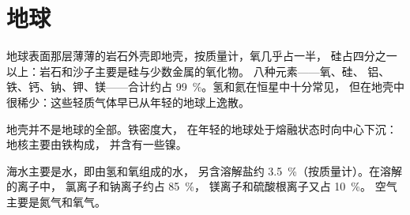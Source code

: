 \section{地球}

\begin{proposition}[地壳]\label{prop:g9:elements-universe-earth:crust}
地球表面那层薄薄的岩石外壳即地壳，按质量计，氧几乎占一半，
硅占四分之一以上：岩石和沙子主要是硅与少数金属的氧化物。
八种元素——氧、硅、
铝、铁、钙、钠、钾、镁——合计约占
\qty{99}{\percent}。氢和氦在恒星中十分常见，
但在地壳中很稀少：这些轻质气体早已从年轻的地球上逸散。
\end{proposition}

\begin{remark}[地球内部]\label{rem:g9:elements-universe-earth:core}
地壳并不是地球的全部。铁密度大，
在年轻的地球处于熔融状态时向中心下沉：地核主要由铁构成，
并含有一些镍。
\end{remark}

\begin{proposition}[海洋与空气]\label{prop:g9:elements-universe-earth:ocean}
海水主要是水，即由氢和氧组成的水，
另含溶解盐约 \qty{3.5}{\percent}（按质量计）。在溶解的离子中，
氯离子和钠离子约占 \qty{85}{\percent}，
镁离子和硫酸根离子又占 \qty{10}{\percent}。
空气主要是氮气和氧气。
\end{proposition}

